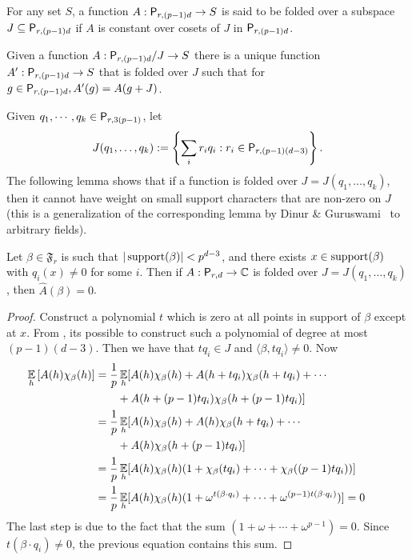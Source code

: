 \begin{definition} 
For any set $S$, a function $A: \mathsf P_{r,(p-1)d} \rightarrow S$ is said
to be folded over a subspace $J \subseteq \mathsf P_{r,(p-1)d}$ if $A$ is constant
over cosets of $J$ in $\mathsf P_{r,(p-1)d}$. 
\end{definition} 
\begin{fact}
\label{fact:ideallift} Given a function $A:\mathsf P_{r,(p-1)d}/J \rightarrow S$ there
is a unique function $A':\mathsf P_{r,(p-1)d} \rightarrow S$ that is folded over $J$
such that for $g \in \mathsf P_{r,(p-1)d}, A'(g) = A(g + J)$. 
\end{fact} 
Given
$q_1,\cdots, q_k \in \mathsf P_{r,3(p-1)}$, let 
$$J(q_1,\dots,q_k): = \left\{ \sum_i r_i q_i : r_i \in \mathsf P_{r,(p-1)(d-3)}\right\}.$$ 
The following lemma shows that
if a function is folded over $J=J(q_1,\dots,q_k)$, then it cannot have weight on
small support characters that are non-zero on $J$ (this is a generalization of
the corresponding lemma by Dinur \& Guruswami~\cite{DinurG2013} to arbitrary
fields). 
\begin{lemma} \label{lem:goodsupport} Let $\beta \in \mathfrak F_r$ is
such that $|\operatorname{\mbox{\textnormal{support}}}(\beta)| < p^{d-3}$, and there exists $x \in \operatorname{\mbox{\textnormal{support}}}(\beta)$ with
$q_i(x) \neq 0$ for some $i$. Then if $A:\mathsf P_{r,d}\rightarrow \mathbb C$ is folded over
$J=J(q_1,\dots,q_k)$, then $\widehat{A}(\beta) = 0$. 
\end{lemma} 
\begin{proof}
Construct a polynomial $t$ which is zero at all points in support of $\beta$
except at $x$. From , its possible to construct such a
polynomial of degree at most $(p-1)(d -3)$. Then we have that $tq_i \in J$ and
$\langle\beta,tq_i\rangle \neq 0$. Now 
\begin{align*}
\operatorname*{\mathbb E}_h\left[A(h)\chi_\beta(h)\right] &=\frac{1}{p} \operatorname*{\mathbb E}_h[ A(h)\chi_\beta(h) +
A(h+tq_i)\chi_\beta(h+tq_i)+\cdots \\
&\qquad + A(h+(p-1)tq_i)\chi_\beta(h+(p-1)tq_i)]\\
 &=\frac{1}{p}\operatorname*{\mathbb E}_h[ A(h)\chi_\beta(h) + A(h)\chi_\beta(h+tq_i) +\cdots\\
 & \qquad + A(h)\chi_\beta(h+(p-1)tq_i)]\\ 
 &=\frac{1}{p}\operatorname*{\mathbb E}_h[ A(h)\chi_\beta(h)(1+\chi_\beta(tq_i)+\cdots+\chi_\beta((p-1)tq_i)) ]\\ 
 &=\frac{1}{p}\operatorname*{\mathbb E}_h[ A(h)\chi_\beta(h)(1+\omega^{t(\beta \cdot q_i)}+\cdots+\omega^{(p-1)t(\beta \cdot q_i)}) ] =0\qquad \qedhere 
\end{align*} 
The last step is due to the fact that  the sum $(1+\omega+\cdots+ \omega^{p-1}) =0$. Since $t(\beta\cdot q_i) \neq 0$,
the previous equation contains this sum.
\end{proof}
